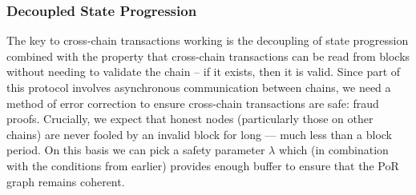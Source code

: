 \subsubsection{Decoupled State Progression}

The key to cross-chain transactions working is the decoupling of state progression combined with the property that cross-chain transactions can be read from \cR blocks without needing to validate the \cR chain -- if it exists, then it is valid.
Since part of this protocol involves asynchronous communication between chains, we need a method of error correction to ensure cross-chain transactions are safe: fraud proofs.
Crucially, we expect that honest nodes (particularly those on other chains) are never fooled by an invalid block for long --- much less than a block period.
On this basis we can pick a safety parameter $\lambda$ which (in combination with the conditions from earlier) provides enough buffer to ensure that the PoR graph remains coherent.

